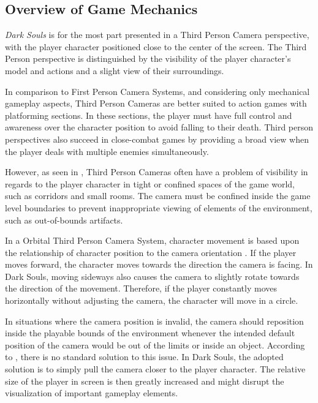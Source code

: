 \subsection{Overview of Game Mechanics}

\emph{Dark Souls} is for the most part presented in a Third Person Camera perspective, with the player character positioned close to the center of the screen. The Third Person perspective is distinguished by the visibility of the player character's model and actions and a slight view of their surroundings.

In comparison to First Person Camera Systems, and considering only mechanical gameplay aspects, Third Person Cameras are better suited to action games with platforming sections. In these sections, the player must have full control and awareness over the character position to avoid falling to their death. Third person perspectives also succeed in close-combat games by providing a broad view when the player deals with multiple enemies simultaneously.

However, as seen in \cite{BOOK_LevelUpTheGuideToGreat}, Third Person Cameras often have a problem of visibility in regards to the player character in tight or confined spaces of the game world, such as corridors and small rooms. The camera must be confined inside the game level boundaries to prevent inappropriate viewing of elements of the environment, such as  out-of-bounds artifacts.

In a Orbital Third Person Camera System, character movement is based upon the relationship of character position to the camera orientation \cite{BOOK_RealTimeCameras}. If the player moves forward, the character moves towards the direction the camera is facing. In Dark Souls, moving sideways also causes the camera to slightly rotate towards the direction of the movement. Therefore, if the player constantly moves horizontally without adjusting the camera, the character will move in a circle.

In situations where the camera position is invalid, the camera should reposition inside the playable bounds of the environment whenever the intended default position of the camera would be out of the limits or inside an object. According to \cite{BOOK_RealTimeCameras}, there is no standard solution to this issue. In Dark Souls, the adopted solution is to simply pull the camera closer to the player character. The relative size of the player in screen is then greatly increased and might disrupt the visualization of important gameplay elements. 

